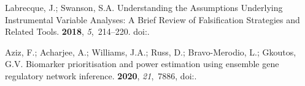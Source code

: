 \documentclass[genes,article,accept,moreauthors,pdftex]{Definitions/mdpi}
\begin{document}
\begin{thebibliography}{999}
Labrecque, J.; Swanson, S.A.
\newblock Understanding the {Assumptions} {Underlying} {Instrumental}
  {Variable} {Analyses}: A {Brief} {Review} of {Falsification} {Strategies} and
  {Related} {Tools}.
 {\bf 2018}, {\em 5},~214--220.
\newblock
  doi:{\href{https://doi.org/10.1007/s40471-018-0152-1}{}}.

Aziz, F.; Acharjee, A.; Williams, J.A.; Russ, D.; Bravo-Merodio, L.; Gkoutos,
  G.V.
\newblock Biomarker prioritisation and power estimation using ensemble gene
  regulatory network inference.
 {\bf 2020}, {\em
  21},~7886,
\newblock 
  doi:{\href{https://doi.org/10.3390/ijms21217886}{}}.

\end{thebibliography}


\end{document}
